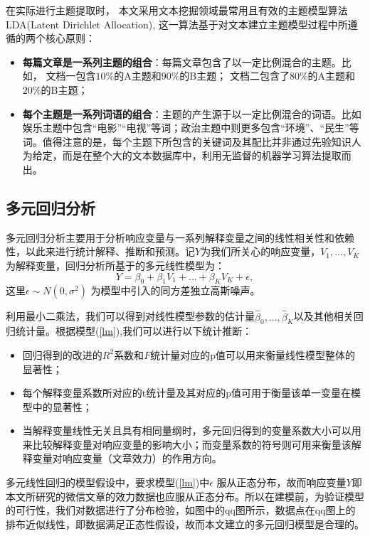 \documentclass[a4paper,12pt,UTF8]{article}
\begin{document}
    在实际进行主题提取时， 本文采用文本挖掘领域最常用且有效的主题模型算法LDA(Latent Dirichlet Allocation), 这一算法基于对文本建立主题模型过程中所遵循的两个核心原则：
    
    \begin{itemize}
      \item \textbf{每篇文章是一系列主题的组合}：每篇文章包含了以一定比例混合的主题。比如， 文档一包含$10\%$的A主题和$90\%$的B主题； 文档二包含了$80\%$的A主题和$20\%$的B主题；
      \item \textbf{每个主题是一系列词语的组合}：主题的产生源于以一定比例混合的词语。比如
      娱乐主题中包含“电影”“电视”等词；政治主题中则更多包含“环境”、“民生”等词。值得注意的是，每个主题下所包含的关键词及其配比并非通过先验知识人为给定，而是在整个大的文本数据库中，利用无监督的机器学习算法提取而出。
    \end{itemize}
    
    \subsection{多元回归分析}
    多元回归分析主要用于分析响应变量与一系列解释变量之间的线性相关性和依赖性，以此来进行统计解释、推断和预测。记$Y$为我们所关心的响应变量，$V_1,...,V_K$为解释变量，回归分析所基于的多元线性模型为：
    \begin{equation}\label{lm}
      Y = \beta_0+ \beta_1 V_1+...+\beta_K V_K +\epsilon,
    \end{equation}
    这里$\epsilon \sim N(0,\sigma^2)$ 为模型中引入的同方差独立高斯噪声。
    
    利用最小二乘法，我们可以得到对线性模型参数的估计量$\hat\beta_0,...,\hat\beta_K$以及其他相关回归统计量。根据模型(\ref{lm}),我们可以进行以下统计推断：
    \begin{itemize}
      \item 回归得到的改进的$R^2$系数和$F$统计量对应的p值可以用来衡量线性模型整体的显著性；
      \item 每个解释变量系数所对应的t统计量及其对应的p值可用于衡量该单一变量在模型中的显著性；
      \item 当解释变量线性无关且具有相同量纲时，多元回归得到的变量系数大小可以用来比较解释变量对响应变量的影响大小；而变量系数的符号则可用来衡量该解释变量对响应变量（文章效力）的作用方向。
    \end{itemize}

    多元线性回归的模型假设中，要求模型(\ref{lm})中$\epsilon$ 服从正态分布，故而响应变量$Y$即本文所研究的微信文章的效力数据也应服从正态分布。所以在建模前，为验证模型的可行性，我们对数据进行了分布检验，如图中的qq图所示，数据点在qq图上的排布近似线性，即数据满足正态性假设，故而本文建立的多元回归模型是合理的。
\end{document}
